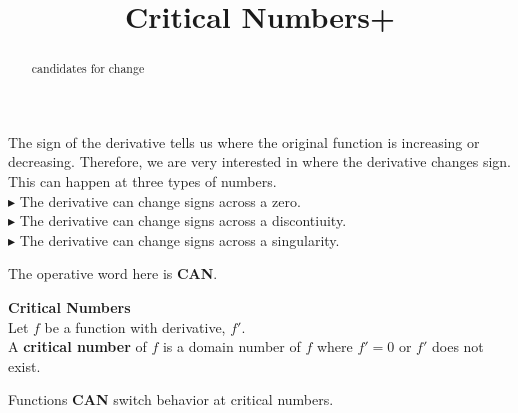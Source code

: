 \documentclass{ximera}
\title{Critical Numbers+}
\begin{document}
\begin{abstract}
candidates for change
\end{abstract}
\maketitle








The sign of the derivative tells us where the original function is increasing or decreasing.  Therefore, we are very interested in where the derivative changes sign.\\

This can happen at three types of numbers. \\


\textbf{\textcolor{red!90!darkgray}{$\blacktriangleright$}} The derivative can change signs across a zero. \\


\textbf{\textcolor{red!90!darkgray}{$\blacktriangleright$}} The derivative can change signs across a discontiuity. \\


\textbf{\textcolor{red!90!darkgray}{$\blacktriangleright$}}  The derivative can change signs across a singularity. \\



\begin{center}
The operative word here is \textbf{\textcolor{red!80!black}{CAN}}.
\end{center}




\begin{template}  \textbf{\textcolor{blue!55!black}{Critical Numbers}}  \\

Let $f$ be a function with derivative, $f'$. \\


A \textbf{\textcolor{green!50!black}{critical number}} of $f$ is a domain number of $f$ where $f' = 0$ or $f'$ does not exist.


\end{template}

Functions \textbf{\textcolor{red!80!black}{CAN}} switch behavior at critical numbers. \\
\end{document}
